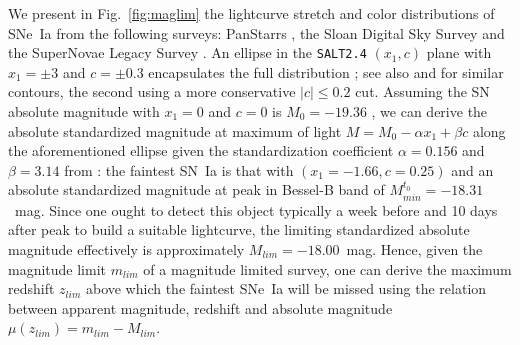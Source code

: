 \documentclass[]{aa} %
\begin{document}
We present in Fig.~\ref{fig:maglim} the lightcurve stretch and color
distributions of SNe~Ia from the following surveys: PanStarrs
\citep[PS1][]{rest2014}, the Sloan Digital Sky Survey
\citep[SDSS][]{frieman2008} and the SuperNovae Legacy Survey
\citep[SNLS][]{astier2006}. An ellipse in the \textsc{\texttt{SALT2.4}} $(x_1,
c)$ plane with $x_1 = \pm 3$ and $c = \pm 0.3$ encapsulates the full distribution
\citep{guy2007,betoule2014}; see also \citet{bazin2011} and \citet{campbell2013}
for similar contours, the second using a more conservative $|c| \leq 0.2$ cut.
Assuming the SN absolute magnitude with $x_1=0$ and $c=0$ is $M_0=-19.36$
\citep{kessler2009,scolnic2014}, we can derive the absolute standardized
magnitude at maximum of light $M = M_0 - \alpha x_1 + \beta c$ along the
aforementioned ellipse given the standardization coefficient $\alpha=0.156$ and
$\beta=3.14$ from \cite{scolnic2018a}: the faintest SN~Ia is that with
$(x_1=-1.66, c=0.25)$ and an absolute standardized magnitude at peak in Bessel-B
band of $M^{t_0}_{min} = -18.31$~mag. Since one ought to detect this object
typically a week before and 10 days after peak to build a suitable lightcurve,
the limiting standardized absolute magnitude effectively is approximately
$M_{lim} = -18.00$~mag. Hence, given the magnitude limit $m_{lim}$ of a
magnitude limited survey, one can derive the maximum redshift $z_{lim}$ above
which the faintest SNe~Ia will be missed using the relation between apparent
magnitude, redshift and absolute magnitude $\mu(z_{lim}) = m_{lim} - M_{lim}$.
\end{document}
